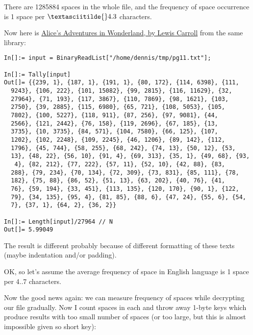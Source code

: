 There are 1285884 spaces in the whole file, and the frequency of space occurrence is 1 space per
$\textasciitilde{}4.3$ characters.

Now here is \href{http://www.gutenberg.org/ebooks/11}{Alice's Adventures in Wonderland, by Lewis Carroll}
from the same library:

\begin{lstlisting}[caption=Mathematica,style=custommath]
In[]:= input = BinaryReadList["/home/dennis/tmp/pg11.txt"];

In[]:= Tally[input]
Out[]= {{239, 1}, {187, 1}, {191, 1}, {80, 172}, {114, 6398}, {111, 
  9243}, {106, 222}, {101, 15082}, {99, 2815}, {116, 11629}, {32, 
  27964}, {71, 193}, {117, 3867}, {110, 7869}, {98, 1621}, {103, 
  2750}, {39, 2885}, {115, 6980}, {65, 721}, {108, 5053}, {105, 
  7802}, {100, 5227}, {118, 911}, {87, 256}, {97, 9081}, {44, 
  2566}, {121, 2442}, {76, 158}, {119, 2696}, {67, 185}, {13, 
  3735}, {10, 3735}, {84, 571}, {104, 7580}, {66, 125}, {107, 
  1202}, {102, 2248}, {109, 2245}, {46, 1206}, {89, 142}, {112, 
  1796}, {45, 744}, {58, 255}, {68, 242}, {74, 13}, {50, 12}, {53, 
  13}, {48, 22}, {56, 10}, {91, 4}, {69, 313}, {35, 1}, {49, 68}, {93,
   4}, {82, 212}, {77, 222}, {57, 11}, {52, 10}, {42, 88}, {83, 
  288}, {79, 234}, {70, 134}, {72, 309}, {73, 831}, {85, 111}, {78, 
  182}, {75, 88}, {86, 52}, {51, 13}, {63, 202}, {40, 76}, {41, 
  76}, {59, 194}, {33, 451}, {113, 135}, {120, 170}, {90, 1}, {122, 
  79}, {34, 135}, {95, 4}, {81, 85}, {88, 6}, {47, 24}, {55, 6}, {54, 
  7}, {37, 1}, {64, 2}, {36, 2}}

In[]:= Length[input]/27964 // N
Out[]= 5.99049
\end{lstlisting}

The result is different probably because of different formatting of these texts (maybe indentation and/or padding).

OK, so let's assume the average frequency of space in English language is 1 space per 4..7 characters.

Now the good news again: we can measure frequency of spaces while decrypting our file gradually.
Now I count spaces in each  and throw away 1-byte keys which produce results with too small number of spaces
(or too large, but this is almost impossible given so short key):

